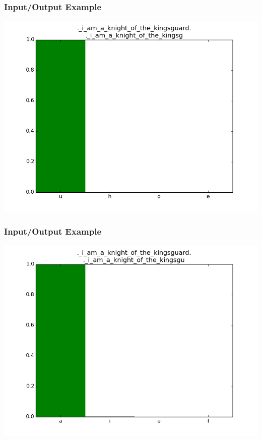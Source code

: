 \documentclass[12]{beamer}
\begin{document}
\begin{frame}
\frametitle{Input/Output Example}
\begin{center}
\includegraphics[scale=0.4]{../distplot/28.png}
\end{center}
\end{frame}

\begin{frame}
\frametitle{Input/Output Example}
\begin{center}
\includegraphics[scale=0.4]{../distplot/29.png}
\end{center}
\end{frame}
\end{document}
